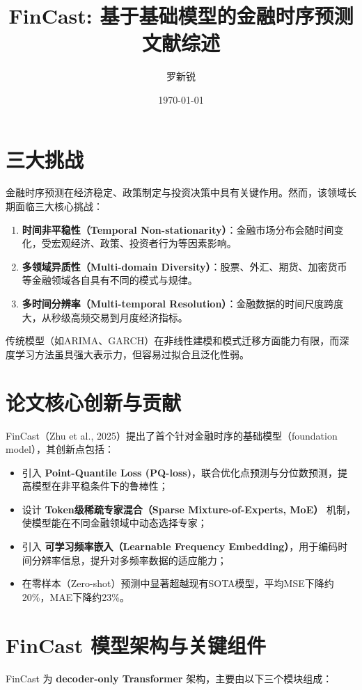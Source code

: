 \documentclass[UTF8]{article}
\title{FinCast: 基于基础模型的金融时序预测文献综述}
\author{罗新锐}
\date{\today}
\begin{document}
\maketitle

\section{三大挑战}
金融时序预测在经济稳定、政策制定与投资决策中具有关键作用。然而，该领域长期面临三大核心挑战：

\begin{enumerate}
  \item \textbf{时间非平稳性（Temporal Non-stationarity）}：金融市场分布会随时间变化，受宏观经济、政策、投资者行为等因素影响。
  \item \textbf{多领域异质性（Multi-domain Diversity）}：股票、外汇、期货、加密货币等金融领域各自具有不同的模式与规律。
  \item \textbf{多时间分辨率（Multi-temporal Resolution）}：金融数据的时间尺度跨度大，从秒级高频交易到月度经济指标。
\end{enumerate}

传统模型（如ARIMA、GARCH）在非线性建模和模式迁移方面能力有限，而深度学习方法虽具强大表示力，但容易过拟合且泛化性弱。

\section{论文核心创新与贡献}
FinCast（Zhu et al., 2025）提出了首个针对金融时序的基础模型（foundation model），其创新点包括：

\begin{itemize}
  \item 引入 \textbf{Point-Quantile Loss (PQ-loss)}，联合优化点预测与分位数预测，提高模型在非平稳条件下的鲁棒性；
  \item 设计 \textbf{Token级稀疏专家混合（Sparse Mixture-of-Experts, MoE）} 机制，使模型能在不同金融领域中动态选择专家；
  \item 引入 \textbf{可学习频率嵌入（Learnable Frequency Embedding）}，用于编码时间分辨率信息，提升对多频率数据的适应能力；
  \item 在零样本（Zero-shot）预测中显著超越现有SOTA模型，平均MSE下降约20\%，MAE下降约23\%。
\end{itemize}

\section{FinCast 模型架构与关键组件}
FinCast 为 \textbf{decoder-only Transformer} 架构，主要由以下三个模块组成：
\end{document}
